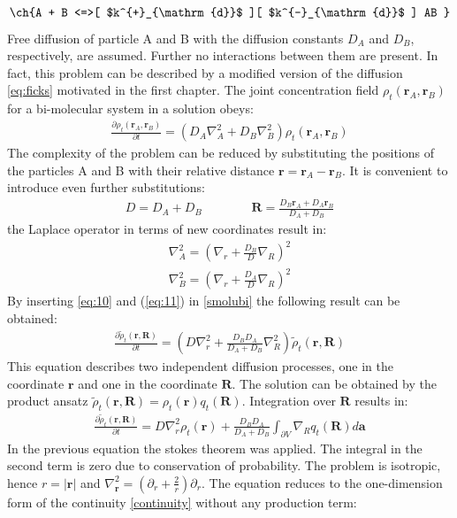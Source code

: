 \documentclass[
  a4paper,BCOR10mm,twoside,
  headsepline,footsepline,%
  fleqn,openbib
]{scrbook}
\begin{document}
\begin{align}\label{reactionscemebi}
\text{\ch{A + B <=>[ $k^{+}_{\mathrm{d}}$ ][ $k^{-}_{\mathrm{d}}$ ] AB }}
\end{align}
Free diffusion of particle A and B with the diffusion constants $D_A$ and $D_B$, respectively, are assumed. Further no interactions between them are present. In fact, this problem can be described by a modified version of the diffusion \cref{eq:ficks} motivated in the first chapter.
The joint concentration field $\rho_t(\bm{r}_A,\bm{r}_B)$ for a bi-molecular system in a solution obeys:
\begin{align}
 \frac{\partial \rho_t(\bm{r}_A,\bm{r}_B)}{\partial t}=(D_A \nabla^{2}_{A}+D_B \nabla^{2}_{B}) \rho_t(\bm{r}_A,\bm{r}_B) \label{smolubi}
\end{align}
The complexity of the problem can be reduced by substituting the positions of the particles A and B with their relative distance $\bm{r}=\bm{r}_A-\bm{r}_B$. It is convenient to introduce even further substitutions:
\begin{align}
 D= D_A+D_B \qquad \qquad \bm{R}=\frac{D_B \bm{r}_A+ D_A \bm{r}_B}{D_A+D_B}
\end{align}
the Laplace operator in terms of new coordinates result in:
\begin{align}
\nabla^{2}_{A} = \left( \nabla_r+\frac{D_B}{D} \nabla_R \right)^2 \label{eq:10}\\
\nabla^{2}_{B} = \left( \nabla_r+\frac{D_A}{D} \nabla_R \right)^2 \label{eq:11}
\end{align}
By inserting \cref{eq:10}  and (\ref{eq:11}) in \cref{smolubi} the following result can be obtained:
\begin{align}
 \frac{\partial \tilde{\rho}_t(\bm{r},\bm{R})}{\partial t}=\left(D \nabla^{2}_{r}+\frac{D_B D_A}{D_A+D_B}\nabla^{2}_{R}\right) \tilde{\rho}_t(\bm{r},\bm{R})
\end{align}
This equation describes two independent diffusion processes, one in the coordinate $\bm{r}$ and one in the coordinate $\bm{R}$. The solution can be obtained by the product ansatz $\tilde{\rho}_t(\bm{r},\bm{R})=\rho_t(\bm{r})q_t(\bm{R})$. Integration over $\bm{R}$ results in:
\begin{align}
\frac{\partial \tilde{\rho}_t(\bm{r},\bm{R})}{\partial t}=D \nabla^{2}_{r} \rho_t(\bm{r}) +\frac{D_B D_A}{D_A+D_B}   \int_{\partial V} \nabla_{R} q_t(\bm{R}) d \bm{a}
\end{align}
In the previous equation the stokes theorem was applied. The integral in the second term is zero due to conservation of probability. The problem is isotropic, hence $r=|\bm{r}|$ and $\nabla^{2}_{\bm{r}}=\left(\partial_r+\frac{2}{r}\right)\partial_r$. The equation reduces to the one-dimension form of the continuity \cref{continuity} without any production term:
\end{document}
